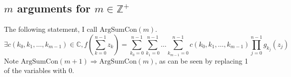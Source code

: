 \documentclass[]{article}
\newcommand{\pqty}[1]{{\left(#1\right)}}
\numberwithin{equation}{section}
\begin{document}
	\subsection{$m$ arguments for $m\in\mathbb{Z}^+$}
	The following statement, I call $\text{ArgSumCon}\pqty{m}$.
	\begin{equation}
		\exists c\pqty{k_0,k_1,\dots,k_{m-1}}\in\mathbb{C}, f\pqty{\sum_{k=0}^{n-1}z_k} =
		\sum_{k_0=0}^{n-1}\sum_{k_1=0}^{n-1}\dots\sum_{k_{m-1}=0}^{n-1}c\pqty{k_0,k_1,\dots,k_{m-1}} \prod_{j=0}^{n-1}g_{k_j}\pqty{z_j}
	\end{equation}
	Note $\text{ArgSumCon}\pqty{m+1}\Rightarrow\text{ArgSumCon}\pqty{m}$, as can be seen by replacing 1 of the variables with 0.
\end{document}

